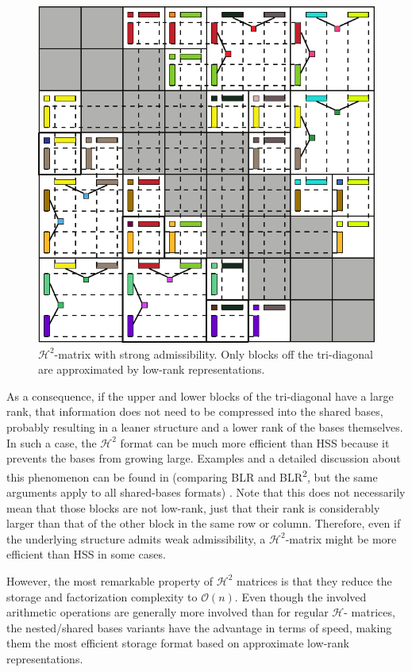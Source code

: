 \begin{figure}[h]
    \centering
    \includegraphics[width=0.6\linewidth]{chapters/4_hierarchical_matrices/figures/H2_matrix.pdf}
    \caption[\texorpdfstring{$\mathcal{H}^2$}{H2}-matrix]{$\mathcal{H}^2$-matrix with strong admissibility. Only blocks off the tri-diagonal are approximated by low-rank representations.}
    \label{fig:h2_matrix}
\end{figure}

As a consequence, if the upper and lower blocks of the tri-diagonal have a large rank, that information does not need to be compressed into the shared bases, probably resulting in a leaner structure and a lower rank of the bases themselves. In such a case, the $\mathcal{H}^2$ format can be much more efficient than HSS because it prevents the bases from growing large. Examples and a detailed discussion about this phenomenon can be found in \cite{ashcraft_block_2020} (comparing BLR and BLR\textsuperscript{2}, but the same arguments apply to all shared-bases formats) . Note that this does not necessarily mean that those blocks are not low-rank, just that their rank is considerably larger than that of the other block in the same row or column. Therefore, even if the underlying structure admits weak admissibility, a $\mathcal{H}^2$-matrix might be more efficient than HSS in some cases.

However, the most remarkable property of $\mathcal{H}^2$ matrices is that they reduce the storage and factorization complexity to $\mathcal{O}(n)$\cite{borm_h2-matrix_2006}.  Even though the involved arithmetic operations are generally more involved than for regular $\mathcal{H}$- matrices, the nested/shared bases variants have the advantage in terms of speed, making them the most efficient storage format based on approximate low-rank representations.